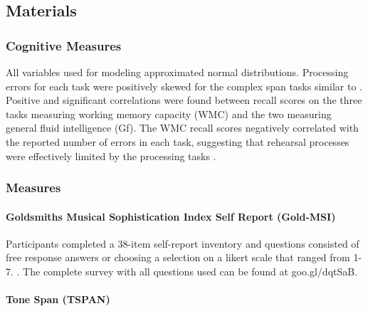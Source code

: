 \documentclass[12pt,]{book}
\let\oldparagraph\paragraph
\renewcommand{\paragraph}[1]{\oldparagraph{#1}\mbox{}}
\begin{document}
\hypertarget{materials}{%
\subsection{Materials}\label{materials}}

\hypertarget{cognitive-measures}{%
\subsubsection{Cognitive Measures}\label{cognitive-measures}}

All variables used for modeling approximated normal distributions.
Processing errors for each task were positively skewed for the complex span tasks similar to \citet{unsworthComplexWorkingMemory2009}.
Positive and significant correlations were found between recall scores on the three tasks measuring working memory capacity (WMC) and the two measuring general fluid intelligence (Gf).
The WMC recall scores negatively correlated with the reported number of errors in each task, suggesting that rehearsal processes were effectively limited by the processing tasks \citep{unsworthComplexWorkingMemory2009}.

\hypertarget{measures}{%
\subsubsection{Measures}\label{measures}}

\hypertarget{goldsmiths-musical-sophistication-index-self-report-gold-msi}{%
\paragraph{Goldsmiths Musical Sophistication Index Self Report (Gold-MSI)}\label{goldsmiths-musical-sophistication-index-self-report-gold-msi}}

Participants completed a 38-item self-report inventory and questions consisted of free response answers or choosing a
selection on a likert scale that ranged from 1-7. \citep{mullensiefenMusicalityNonMusiciansIndex2014}.
The complete survey with all questions used can be found at goo.gl/dqtSaB.

\hypertarget{tone-span-tspan}{%
\paragraph{Tone Span (TSPAN)}\label{tone-span-tspan}}
\end{document}
